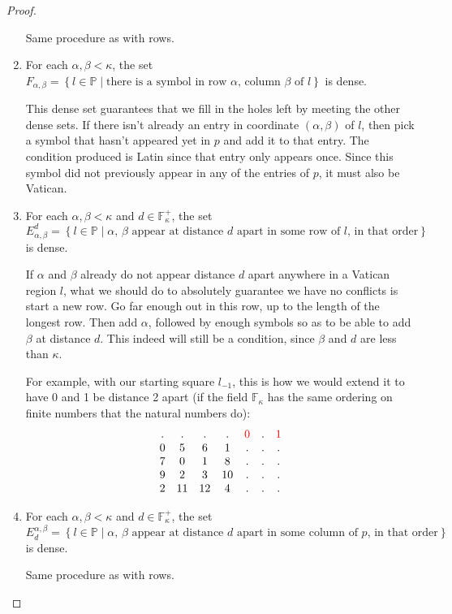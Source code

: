 \documentclass[12pt,a4paper]{article}
\newcommand{\F}{\mathbb{F}}
\newcommand{\st}{\; | \;}
\newcommand{\set}[2]{\left\{#1\st #2 \right\}}
\renewcommand{\P}{\mathbb{P}}
\begin{document}
\begin{proof}
\begin{enumerate}
	Same procedure as with rows.	
	
	\item For each $\alpha, \beta < \kappa$, the set $F_{\alpha, \beta}=\set{l \in \P}{\text{there is a symbol in row $\alpha$, column $\beta$ of $l$}}$ is dense.
	
	This dense set guarantees that we fill in the holes left by meeting the other dense sets. If there isn't already an entry in coordinate $(\alpha, \beta)$ of $l$, then pick a symbol that hasn't appeared yet in $p$ and add it to that entry. The condition produced is Latin since that entry only appears once. Since this symbol did not previously appear in any of the entries of $p$, it must also be Vatican.
	
	\item For each $\alpha, \beta<\kappa$ and $d \in \F_\kappa^+$, the set $$E^d_{\alpha, \beta}=\set{l \in \P}{\text{$\alpha$, $\beta$ appear at distance $d$ apart in some row of $l$, in that order}}$$ is dense.
	
	If $\alpha$ and $\beta$ already do not appear distance $d$ apart anywhere in a Vatican region $l$, what we should do to absolutely guarantee we have no conflicts is start a new row. Go far enough out in this row, up to the length of the longest row. Then add $\alpha$, followed by enough symbols so as to be able to add $\beta$ at distance $d$. This indeed will still be a condition, since $\beta$ and $d$ are less than $\kappa$.
	
	For example, with our starting square $l_{-1}$, this is how we would extend it to have 0 and 1 be distance 2 apart (if the field $\F_\kappa$ has the same ordering on finite numbers that the natural numbers do):
$$\begin{array}{ccccccc}
	. &.  &.  & . & \color{red}0 & . &\color{red}1\\
	0 & 5 & 6 & 1 &. &. &. \\ 
	7 &  0 & 1 & 8 &. &. &.  \\
	9 & 2 & 3 & 10 &. &. &. \\
	2 & 11 & 12 & 4 &. &. &. 
\end{array}$$
	
	\item For each $\alpha, \beta<\kappa$ and $d \in \F_\kappa^+$, the set $$E_d^{\alpha, \beta}=\set{l \in \P}{\text{$\alpha$, $\beta$ appear at distance $d$ apart in some column of $p$, in that order}}$$ is dense.
	
	Same procedure as with rows.
	

\end{enumerate}


\end{proof}
\end{document}
